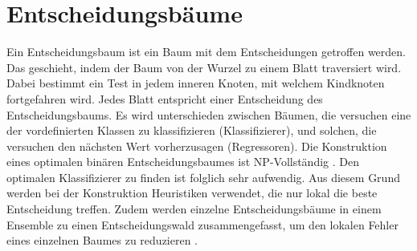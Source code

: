 \chapter{Entscheidungsbäume}
Ein Entscheidungsbaum ist ein Baum mit dem Entscheidungen getroffen werden. Das geschieht, indem der Baum von der Wurzel zu einem Blatt traversiert wird. Dabei bestimmt ein Test in jedem
inneren Knoten, mit welchem Kindknoten fortgefahren wird. Jedes Blatt entspricht einer Entscheidung des Entscheidungsbaums. Es wird unterschieden zwischen Bäumen, die versuchen eine der
vordefinierten Klassen zu klassifizieren (Klassifizierer), und solchen, die versuchen den nächsten Wert vorherzusagen (Regressoren).
\newline
\newline
Die Konstruktion eines optimalen binären Entscheidungsbaumes ist NP-Vollständig \cite{laurent1976constructing}. Den optimalen Klassifizierer zu finden ist folglich sehr aufwendig.
Aus diesem Grund werden bei der Konstruktion Heuristiken verwendet, die nur lokal die beste Entscheidung treffen. Zudem werden einzelne Entscheidungsbäume in einem Ensemble zu einen
Entscheidungswald zusammengefasst, um den lokalen Fehler eines einzelnen Baumes zu reduzieren \cite{ScikitLearnEnsemble}.






